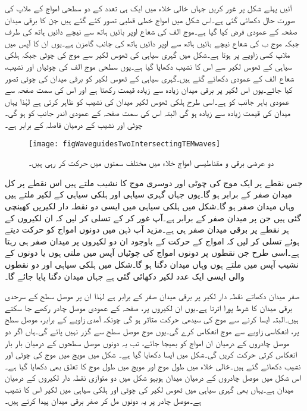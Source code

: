 آئیں پہلے شکل  پر غور کریں جہاں خالی خلاء میں ایک ہی تعدد کے دو سطحی  امواج کے ملاپ کی صورت حال دکھائی گئی ہے۔اس شکل میں امواج خطی قطبی تصور کئے گئے ہیں جن کا برقی میدان صفحہ کے عمودی فرض کیا گیا ہے۔موج الف کی شعاع اوپر بائیں ہاتھ سے نیچے دائیں ہاتھ کی طرف جبکہ موج ب کی شعاع نیچے بائیں ہاتھ سے اوپر دائیں ہاتھ کی جانب گامزن ہے۔یوں ان کا آپس میں ملاپ کسی زاویے پر ہوتا ہے۔شکل میں گہری سیاہی کی ٹھوس لکیر سے موج کی چوٹی جبکہ ہلکی سیاہی کے ٹھوس لکیر سے اس کا نشیب دکھایا گیا ہے۔یوں سطحی موج الف کی چوٹیاں اور نشیب، شعاع الف کے عمودی دکھائے گئے ہیں۔گہری سیاہی کے ٹھوس لکیر کو برقی میدان کی چوٹی تصور کیا جائے۔یوں اس لکیر پر برقی میدان زیادہ سے زیادہ قیمت رکھتا ہے اور اس کی سمت صفحہ سے عمودی باہر جانب کو ہے۔اسی طرح ہلکی ٹھوس لکیر میدان کی نشیب کو ظاہر کرتی ہے لہٰذا یہاں میدان کی قیمت زیادہ سے زیادہ ہو گی البتہ اس کی سمت صفحہ کے عمودی اندر جانب کو ہو گی۔چوٹی اور نشیب کے درمیان فاصلہ  کے برابر ہے۔ 
%
\begin{figure}
\centering
\texttt{[image: figWaveguidesTwoIntersectingTEMwaves]}
\caption{دو عرضی برقی و مقناطیسی امواج خلاء میں مختلف سمتوں میں حرکت کر رہی ہیں۔}
\label{شکل_مویج_دو_عرضی_امواج_خالی_خلاء}
\end{figure}

جس نقطے پر ایک موج کی چوٹی اور دوسری موج کا نشیب ملتے ہیں اس نقطے پر کل میدان صفر کے برابر ہو گا۔یوں جہاں گہری سیاہی اور ہلکی سیاہی کے لکیر ملتے ہیں وہاں میدان صفر ہو گا۔شکل میں ہلکی سیاہی میں ایسی دو نقطہ دار لکیریں کھینچی گئی ہیں جن پر میدان صفر کے برابر ہے۔آپ غور کر کے تسلی کر لیں کہ ان لکیروں کے ہر نقطے پر برقی میدان صفر ہی ہے۔مزید آپ ذہن میں دونوں امواج کو حرکت دیتے ہوئے تسلی کر لیں کہ امواج کے حرکت کے باوجود ان دو لکیروں پر میدان صفر ہی رہتا ہے۔اسی طرح جن نقطوں پر دونوں امواج کی چوٹیاں آپس میں ملتی ہوں یا دونوں کے نشیب آپس میں ملتے ہوں وہاں میدان دگنا ہو گا۔شکل میں ہلکی سیاہی اور دو نقطوں والی ایسی ایک عدد  لکیر دکھائی گئی ہے جہاں میدان دگنا پایا جائے گا۔

صفر میدان دکھاتے نقطہ دار لکیر پر برقی میدان صفر کے برابر ہے لہٰذا ان پر موصل سطح کے سرحدی برقی میدان کا شرط پورا اترتا ہے۔یوں ان لکیروں پر، صفحہ کے عمودی  موصل چادر رکھے جا سکتے ہیں۔البتہ ایسا کرنے سے موج کی سیدھی حرکت متاثر ہو گی چونکہ آمدی زاویے کے برابر، موصل سطح پر، انعکاسی زاویے سے موج انعکاس کرے گی۔یوں موج موصل سطح سے گزر نہیں پائے گی۔ہاں اگر دو موصل چادروں کے درمیان ان امواج کو بھیجا جائے، تب یہ دونوں موصل سطحوں کے درمیان بار بار انعکاس کرتی حرکت کریں گی۔شکل  میں ایسا دکھایا گیا ہے۔ شکل  میں مویج میں موج کی چوٹی اور نشیب دکھائے گئے ہیں۔خالی خلاء میں طول موج اور مویج میں طول موج کا تعلق بھی دکھایا گیا ہے۔ اس شکل میں موصل چادروں کے درمیان میدان ہوبہو شکل  میں دو متوازی نقطہ دار لکیروں کے درمیان میدان ہے۔یہاں بھی گہری سیاہی میں ٹھوس لکیر  کی چوٹی اور ہلکی سیاہی میں لکیر اس کا نشیب ہے۔موصل چادر پر یہ دونوں مل کر صفر برقی میدان پیدا کرتے ہیں۔   

